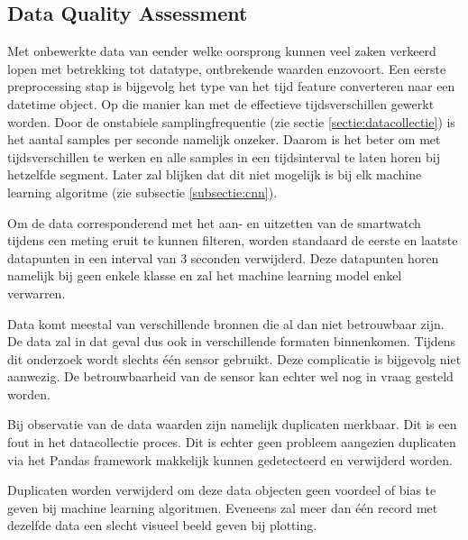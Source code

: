\subsection{Data Quality Assessment}
Met onbewerkte data van eender welke oorsprong kunnen veel zaken verkeerd lopen met betrekking tot datatype, ontbrekende waarden enzovoort.
Een eerste preprocessing stap is bijgevolg het type van het tijd feature converteren naar een datetime object. Op die manier kan met de effectieve tijdsverschillen gewerkt worden. 
Door de onstabiele samplingfrequentie (zie sectie \ref{sectie:datacollectie}) is het aantal samples per seconde namelijk onzeker. Daarom is het beter om met tijdsverschillen te werken en alle samples in een tijdsinterval te laten horen bij hetzelfde segment. Later zal blijken dat dit niet mogelijk is bij elk machine learning algoritme (zie subsectie \ref{subsectie:cnn}).

Om de data corresponderend met het aan- en uitzetten van de smartwatch tijdens een meting eruit te kunnen filteren, worden standaard de eerste en laatste datapunten in een interval van 3 seconden verwijderd. Deze datapunten horen namelijk bij geen enkele klasse en zal het machine learning model enkel verwarren.

Data komt meestal van verschillende bronnen die al dan niet betrouwbaar zijn. De data zal in dat geval dus ook in verschillende formaten binnenkomen. Tijdens dit onderzoek wordt slechts één sensor gebruikt. Deze complicatie is bijgevolg niet aanwezig. De betrouwbaarheid van de sensor kan echter wel nog in vraag gesteld worden.

Bij observatie van de data waarden zijn namelijk duplicaten merkbaar. Dit is een fout in het datacollectie proces. Dit is echter geen probleem aangezien duplicaten via het Pandas framework makkelijk kunnen gedetecteerd en verwijderd worden.

Duplicaten worden verwijderd om deze data objecten geen voordeel of bias te geven bij machine learning algoritmen. Eveneens zal meer dan één record met dezelfde data een slecht visueel beeld geven bij plotting.

